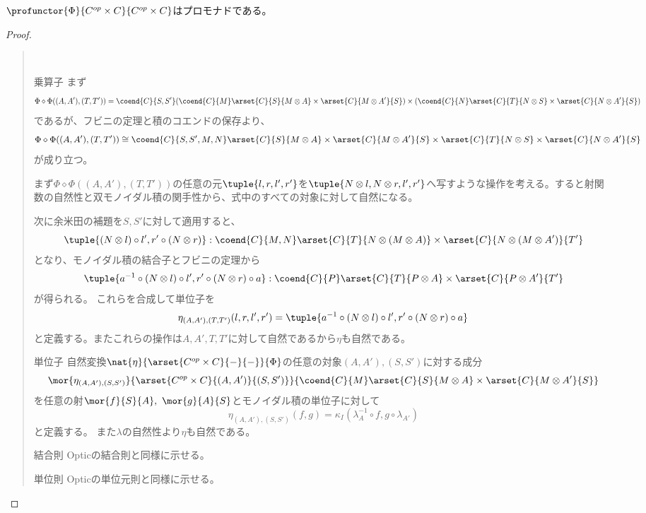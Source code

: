 \documentclass[uplatex,dvipdfmx]{jsarticle}
\begin{document}
  \begin{prop}
    $\profunctor{\Phi}{C^{op}\times C}{C^{op}\times C}$はプロモナドである。
  \end{prop}
  \begin{proof}
    \begin{quote}~
      \begin{mydescription}
        \item[乗算子]まず\[\Phi\diamond\Phi((A,A'),(T,T')) = \coend{C}{S,S'}(\coend{C}{M}\arset{C}{S}{M\otimes A}\times \arset{C}{M\otimes A'}{S})\times(\coend{C}{N}\arset{C}{T}{N\otimes S}\times \arset{C}{N\otimes A'}{S})\]であるが、フビニの定理と積のコエンドの保存より、
        \[\Phi\diamond\Phi((A,A'),(T,T')) \cong \coend{C}{S,S',M,N}\arset{C}{S}{M\otimes A}\times \arset{C}{M\otimes A'}{S}\times \arset{C}{T}{N\otimes S}\times \arset{C}{N\otimes A'}{S}\]が成り立つ。

        まず$\Phi\diamond\Phi((A,A'),(T,T'))$の任意の元$\tuple{l,  r, l', r'}$を$\tuple{N\otimes l, N\otimes r, l', r'}$へ写すような操作を考える。すると射関数の自然性と双モノイダル積の関手性から、式中のすべての対象に対して自然になる。

        次に余米田の補題を$S,S'$に対して適用すると、
        \[\tuple{(N\otimes l)\circ l', r'\circ (N\otimes r)} : \coend{C}{M,N}\arset{C}{T}{N\otimes(M\otimes A)}\times \arset{C}{N\otimes(M\otimes A')}{T'}\]となり、モノイダル積の結合子とフビニの定理から
        \[\tuple{a^{-1}\circ(N\otimes l)\circ l', r'\circ (N\otimes r)\circ a} : \coend{C}{P}\arset{C}{T}{P\otimes A}\times \arset{C}{P\otimes A'}{T'}\]が得られる。
        これらを合成して単位子を\[\eta_{(A,A'),(T,T')}(l,  r, l', r') = \tuple{a^{-1}\circ(N\otimes l)\circ l', r'\circ (N\otimes r)\circ a}\]と定義する。またこれらの操作は$A,A',T,T'$に対して自然であるから$\eta$も自然である。
        \item[単位子] 
        自然変換$\nat{\eta}{\arset{C^{op}\times C}{-}{-}}{\Phi}$の任意の対象$(A,A'),(S,S')$に対する成分\[\mor{\eta_{(A,A'),(S,S')}}{\arset{C^{op}\times C}{(A,A')}{(S,S')}}{\coend{C}{M}\arset{C}{S}{M\otimes A}\times \arset{C}{M\otimes A'}{S}}\]を任意の射$\mor{f}{S}{A},\ \mor{g}{A}{S}$とモノイダル積の単位子に対して\[\eta_{(A,A'),(S,S')}(f,g) = \kappa_I(\lambda_A^{-1}\circ f,g\circ\lambda_{A'})\]と定義する。
        また$\lambda$の自然性より$\eta$も自然である。
        \item[結合則] Opticの結合則と同様に示せる。
        \item[単位則] Opticの単位元則と同様に示せる。
      \end{mydescription}
    \end{quote}
  \end{proof}
\end{document}
